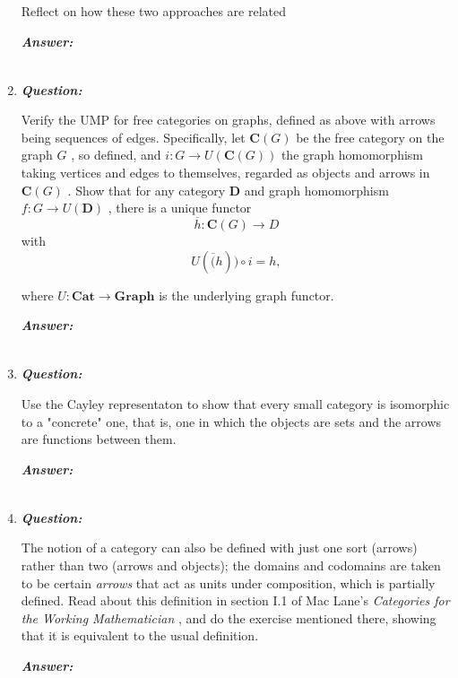 \documentclass{article}
\begin{document}
\begin{enumerate}
\begin{enumerate}
	      \end{enumerate}
	      Reflect on how these two approaches are related


	      \textbf{\textit{Answer:}}

	      \begin{align*}
	      \end{align*}



	\item
	      \textbf{\textit{Question:}}

	      Verify the UMP for free categories on graphs, defined as above with arrows being sequences of edges. Specifically, let $ \textbf{C} (G) $ be the free category on the graph $ G $ , so defined, and $ i : G \rightarrow U(\textbf{C}(G) ) $ the graph homomorphism taking vertices and edges to themselves, regarded as objects and arrows in $ \textbf{C} (G) $ . Show that for any category \textbf{D} and graph homomorphism $ f : G \rightarrow U(\textbf{D} ) $ , there is a unique functor
	      \[
		      \overline{h} : \textbf{C}(G) \rightarrow D
	      \]
	      with
	      \[ U(\overline(h)) \circ i = h ,\]

	      where $ U : \textbf{Cat} \rightarrow \textbf{Graph}  $ is the underlying graph functor.


	      \textbf{\textit{Answer:}}

	      \begin{align*}
	      \end{align*}



	\item
	      \textbf{\textit{Question:}}

	      Use the Cayley representaton to show that every small category is isomorphic to a "concrete" one, that is, one in which the objects are sets and the arrows are functions between them.

	      \textbf{\textit{Answer:}}

	      \begin{align*}
	      \end{align*}



	\item
	      \textbf{\textit{Question:}}

	      The notion of a category can also be defined with just one sort (arrows) rather than two (arrows and objects); the domains and codomains are taken to be certain \textit{arrows} that act as units under composition, which is partially defined. Read about this definition in section I.1 of Mac Lane's \textit{Categories for the Working Mathematician} , and do the exercise mentioned there, showing that it is equivalent to the usual definition.

	      \textbf{\textit{Answer:}}

	      \begin{align*}
	      \end{align*}


\end{enumerate}
\end{document}
